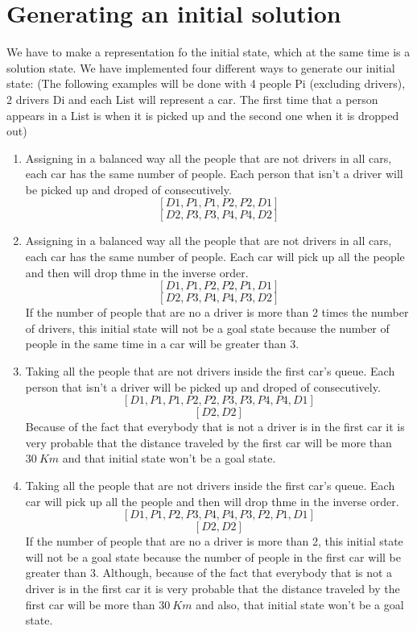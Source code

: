 \documentclass[12]{article}
\begin{document}
\section{Generating an initial solution}
We have to make a representation fo the initial state, which at the same time is a solution state. We have implemented four different ways to generate our initial state: (The following examples will be done with 4 people Pi (excluding drivers), 2 drivers Di and each List will represent a car. The first time that a person appears in a List is when it is picked up and the second one when it is dropped out)
\begin{enumerate}
\item Assigning in a balanced way all the people that are not drivers in all cars, each car has the same number of people. Each person that isn't a driver will be picked up and droped of consecutively.
$$[D1,P1,P1,P2,P2,D1]$$
$$[D2,P3,P3,P4,P4,D2]$$
\item Assigning in a balanced way all the people that are not drivers in all cars, each car has the same number of people. Each car will pick up all the people and then will drop thme in the inverse order.
$$[D1,P1,P2,P2,P1,D1]$$
$$[D2,P3,P4,P4,P3,D2]$$
If the number of people that are no a driver is more than 2 times the number of drivers, this initial state will not be a goal state because the number of people in the same time in a car will be greater than 3.
\item Taking all the people that are not drivers inside the first car's queue. Each person that isn't a driver will be picked up and droped of consecutively.
$$[D1,P1,P1,P2,P2,P3,P3,P4,P4,D1]$$
$$[D2,D2]$$
Because of the fact that everybody that is not a driver is in the first car it is very probable that the distance traveled by the first car will be more than $30\ Km$ and that initial state won't be a goal state.
\item Taking all the people that are not drivers inside the first car's queue. Each car will pick up all the people and then will drop thme in the inverse order.
$$[D1,P1,P2,P3,P4,P4,P3,P2,P1,D1]$$
$$[D2,D2]$$
If the number of people that are no a driver is more than 2, this initial state will not be a goal state because the number of people in the first car will be greater than 3. Although, because of the fact that everybody that is not a driver is in the first car it is very probable that the distance traveled by the first car will be more than $30\ Km$ and also, that initial state won't be a goal state.
\end{enumerate} 
\end{document}
